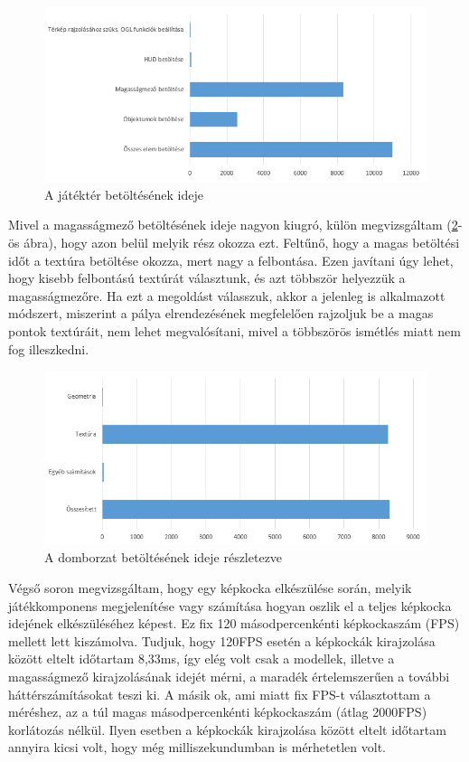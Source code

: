 \begin{figure}[h]
\centering
\includegraphics[scale=0.84]{kepek/map_load_diag.png}
\caption{A játéktér betöltésének ideje}
\label{fig:map_diag}
\end{figure}

Mivel a magasságmező betöltésének ideje nagyon kiugró, külön megvizsgáltam (\ref{fig:height_map_diag}-ös ábra), hogy azon belül melyik rész okozza ezt. Feltűnő, hogy a magas betöltési időt a textúra betöltése okozza, mert nagy a felbontása. Ezen javítani úgy lehet, hogy kisebb felbontású textúrát választunk, és azt többször helyezzük a magasságmezőre. Ha ezt a megoldást válasszuk, akkor a jelenleg is alkalmazott módszert, miszerint a pálya elrendezésének megfelelően rajzoljuk be a magas pontok textúráit, nem lehet megvalósítani, mivel a többszörös ismétlés miatt nem fog illeszkedni.
 
\begin{figure}[h]
\centering
\includegraphics[scale=0.84]{kepek/height_map_load_diag.png}
\caption{A domborzat betöltésének ideje részletezve}
\label{fig:height_map_diag}
\end{figure}

\newpage
Végső soron megvizsgáltam, hogy egy képkocka elkészülése során, melyik játékkomponens megjelenítése vagy számítása hogyan oszlik el a teljes képkocka idejének elkészüléséhez képest. Ez fix 120 másodpercenkénti képkockaszám (FPS) mellett lett kiszámolva. Tudjuk, hogy 120FPS esetén a képkockák kirajzolása között eltelt időtartam 8,33ms, így elég volt csak a modellek, illetve a magasságmező kirajzolásának idejét mérni, a maradék értelemszerűen a további háttérszámításokat teszi ki.
A másik ok, ami miatt fix FPS-t választottam a méréshez, az a túl magas másodpercenkénti képkockaszám (átlag 2000FPS) korlátozás nélkül. Ilyen esetben a képkockák kirajzolása között eltelt időtartam annyira kicsi volt, hogy még milliszekundumban is mérhetetlen volt.

